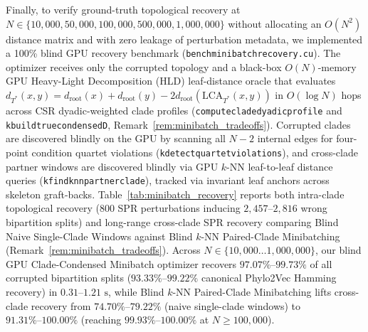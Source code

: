 \documentclass[11pt,a4paper]{article}
\makeatletter
\DeclareRobustCommand{\_}{\ifmmode\nfss@text{\textunderscore}\else\textunderscore\allowbreak\fi}
\theoremstyle{definition}
\makeatother
\begin{document}
Finally, to verify ground-truth topological recovery at $N \in \{10{,}000, 50{,}000, 100{,}000, 500{,}000, 1{,}000{,}000\}$ without allocating an $O(N^2)$ distance matrix and with zero leakage of perturbation metadata, we implemented a 100\% blind GPU recovery benchmark (\texttt{bench\_minibatch\_recovery.cu}). The optimizer receives only the corrupted topology and a black-box $O(N)$-memory GPU Heavy-Light Decomposition (HLD) leaf-distance oracle that evaluates $d_{T^*}(x,y) = d_{\text{root}}(x) + d_{\text{root}}(y) - 2 d_{\text{root}}(\text{LCA}_{T^*}(x,y))$ in $O(\log N)$ hops across CSR dyadic-weighted clade profiles (\texttt{compute\_clade\_dyadic\_profile} and \texttt{k\_build\_true\_condensed\_D}, Remark~\ref{rem:minibatch_tradeoffs}). Corrupted clades are discovered blindly on the GPU by scanning all $N-2$ internal edges for four-point condition quartet violations (\texttt{k\_detect\_quartet\_violations}), and cross-clade partner windows are discovered blindly via GPU $k$-NN leaf-to-leaf distance queries (\texttt{k\_find\_knn\_partner\_clade}), tracked via invariant leaf anchors across skeleton graft-backs. Table~\ref{tab:minibatch_recovery} reports both intra-clade topological recovery ($800$ SPR perturbations inducing $2{,}457\text{--}2{,}816$ wrong bipartition splits) and long-range cross-clade SPR recovery comparing Blind Naive Single-Clade Windows against Blind $k$-NN Paired-Clade Minibatching (Remark~\ref{rem:minibatch_tradeoffs}). Across $N \in \{10{,}000 \dots 1{,}000{,}000\}$, our blind GPU Clade-Condensed Minibatch optimizer recovers $\mathbf{97.07\%\text{--}99.73\%}$ of all corrupted bipartition splits ($\mathbf{93.33\%\text{--}99.22\%}$ canonical Phylo2Vec Hamming recovery) in $0.31\text{--}1.21\text{ s}$, while Blind $k$-NN Paired-Clade Minibatching lifts cross-clade recovery from $74.70\%\text{--}79.22\%$ (naive single-clade windows) to $\mathbf{91.31\%\text{--}100.00\%}$ (reaching $\mathbf{99.93\%\text{--}100.00\%}$ at $N \ge 100{,}000$).
\end{document}
